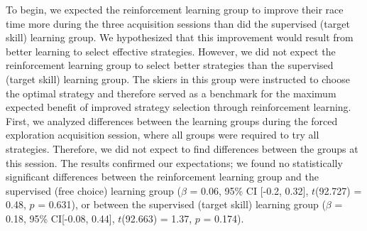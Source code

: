 To begin, we expected the reinforcement learning group to improve their race time more during the three acquisition sessions than did the supervised (target skill) learning group. We hypothesized that this improvement would result from better learning to select effective strategies. However, we did not expect the reinforcement learning group to select better strategies than the supervised (target skill) learning group. The skiers in this group were instructed to choose the optimal strategy and therefore served as a benchmark for the maximum expected benefit of improved strategy selection through reinforcement learning. First, we analyzed differences between the learning groups during the forced exploration acquisition session, where all groups were required to try all strategies. Therefore, we did not expect to find differences between the groups at this session. The results confirmed our expectations; we found no statistically significant differences between the reinforcement learning group and the supervised (free choice) learning group ($\beta$ = 0.06, 95\% CI [-0.2, 0.32], $t$(92.727) = 0.48, $p$ = 0.631), or between the supervised (target skill) learning group  ($\beta$ = 0.18, 95\% CI[-0.08, 0.44], $t$(92.663) = 1.37, $p$ = 0.174).  

